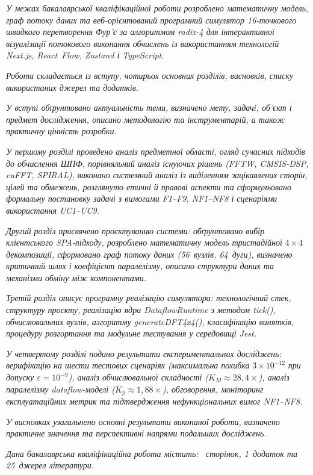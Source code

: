 \documentclass[
]{article}
\begin{document}
\emph{У межах бакалаврської кваліфікаційної роботи розроблено
математичну модель, граф потоку даних та веб-орієнтований програмний
симулятор 16-точкового швидкого перетворення Фур'є за алгоритмом radix-4
для інтерактивної візуалізації потокового виконання обчислень із
використанням технологій Next.js, React~Flow, Zustand і TypeScript.}

\emph{Робота складається із вступу, чотирьох основних розділів,
висновків, списку використаних джерел та додатків.}

\emph{У вступі обґрунтовано актуальність теми, визначено мету, задачі,
об'єкт і предмет дослідження, описано методологію та інструментарій, а
також практичну цінність розробки.}

\emph{У першому розділі проведено аналіз предметної області, огляд
сучасних підходів до обчислення ШПФ, порівняльний аналіз існуючих рішень
(FFTW, CMSIS-DSP, cuFFT, SPIRAL), виконано системний аналіз із
виділенням зацікавлених сторін, цілей та обмежень, розглянуто етичні й
правові аспекти та сформульовано формальну постановку задачі з вимогами
F1--F9, NF1--NF8 і сценаріями використання UC1--UC9.}

\emph{Другий розділ присвячено проєктуванню системи: обґрунтовано вибір
клієнтського SPA-підходу, розроблено математичну модель тристадійної}
\(4 \times 4\) \emph{декомпозиції, сформовано граф потоку даних
(56~вузлів, 64~дуги), визначено критичний шлях і коефіцієнт паралелізму,
описано структури даних та механізми обміну між компонентами.}

\emph{Третій розділ описує програмну реалізацію симулятора:
технологічний стек, структуру проєкту, реалізацію ядра DataflowRuntime з
методом tick(), обчислювальних вузлів, алгоритму generateDFT4x4(),
класифікацію винятків, процедуру розгортання та модульне тестування у
середовищі Jest.}

\emph{У четвертому розділі подано результати експериментальних
досліджень: верифікацію на шести тестових сценаріях (максимальна
похибка} \(3 \times 10^{- 12}\) \emph{при допуску}
\(\varepsilon = 10^{- 9}\)\emph{), аналіз обчислювальної складності
(}\(K_{M} \approx 28,4 \times\)\emph{), аналіз паралелізму
dataflow-моделі (}\(K_{p} \approx 1,88 \times\)\emph{), обговорення,
моніторинг експлуатаційних метрик та підтвердження нефункціональних
вимог NF1--NF8.}

\emph{У висновках узагальнено основні результати виконаної роботи,
визначено практичне значення та перспективні напрями подальших
досліджень.}

\emph{Дана бакалаврська кваліфікаційна робота містить: ~сторінок,
1~додаток та 25~джерел літератури.}
\end{document}
